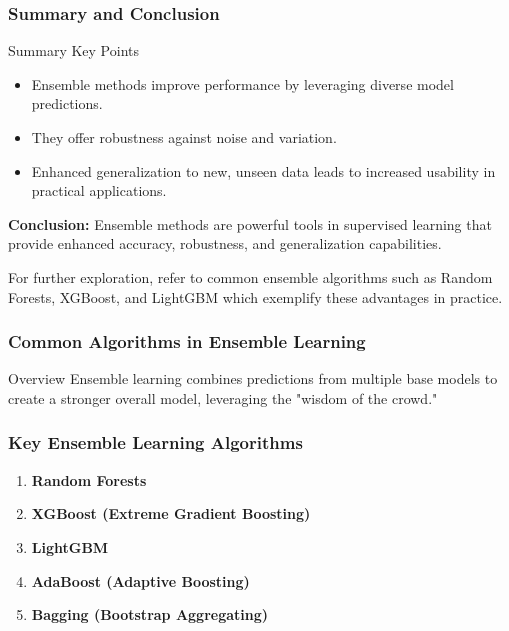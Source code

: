 \documentclass[aspectratio=169]{beamer}
\begin{document}
\begin{frame}[fragile]
    \frametitle{Summary and Conclusion}
    \begin{block}{Summary Key Points}
        \begin{itemize}
            \item Ensemble methods improve performance by leveraging diverse model predictions.
            \item They offer robustness against noise and variation.
            \item Enhanced generalization to new, unseen data leads to increased usability in practical applications.
        \end{itemize}
    \end{block}
    
    \textbf{Conclusion:} Ensemble methods are powerful tools in supervised learning that provide enhanced accuracy, robustness, and generalization capabilities.
    
    For further exploration, refer to common ensemble algorithms such as Random Forests, XGBoost, and LightGBM which exemplify these advantages in practice.
\end{frame}

\begin{frame}
    \frametitle{Common Algorithms in Ensemble Learning}
    \begin{block}{Overview}
        Ensemble learning combines predictions from multiple base models to create a stronger overall model, leveraging the "wisdom of the crowd."
    \end{block}
\end{frame}

\begin{frame}
    \frametitle{Key Ensemble Learning Algorithms}
    \begin{enumerate}
        \item \textbf{Random Forests}
        \item \textbf{XGBoost (Extreme Gradient Boosting)}
        \item \textbf{LightGBM}
        \item \textbf{AdaBoost (Adaptive Boosting)}
        \item \textbf{Bagging (Bootstrap Aggregating)}
    \end{enumerate}
\end{frame}
\end{document}
